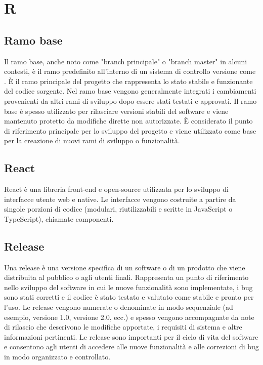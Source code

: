 \section{R}

\vspace{2em}
\subsection*{Ramo base}
Il ramo base, anche noto come "branch principale" o "branch master" in alcuni contesti, è il ramo predefinito all'interno di un sistema di controllo versione come . È il ramo principale del progetto che rappresenta lo stato stabile e funzionante del codice sorgente. Nel ramo base vengono generalmente integrati i cambiamenti provenienti da altri rami di sviluppo dopo essere stati testati e approvati. Il ramo base è spesso utilizzato per rilasciare versioni stabili del software e viene mantenuto protetto da modifiche dirette non autorizzate. È considerato il punto di riferimento principale per lo sviluppo del progetto e viene utilizzato come base per la creazione di nuovi rami di sviluppo o funzionalità.

\vspace{2em}
\subsection*{React}
React è una libreria front-end e open-source utilizzata per lo sviluppo di interfacce utente web e native. Le interfacce vengono costruite a partire da singole porzioni di codice (modulari, riutilizzabili e scritte in JavaScript o TypeScript), chiamate componenti.

\vspace{2em}
\subsection*{Release}
Una release è una versione specifica di un software o di un prodotto che viene distribuita al pubblico o agli utenti finali. Rappresenta un punto di riferimento nello sviluppo del software in cui le nuove funzionalità sono implementate, i bug sono stati corretti e il codice è stato testato e valutato come stabile e pronto per l'uso. Le release vengono numerate o denominate in modo sequenziale (ad esempio, versione 1.0, versione 2.0, ecc.) e spesso vengono accompagnate da note di rilascio che descrivono le modifiche apportate, i requisiti di sistema e altre informazioni pertinenti. Le release sono importanti per il ciclo di vita del software e consentono agli utenti di accedere alle nuove funzionalità e alle correzioni di bug in modo organizzato e controllato.

